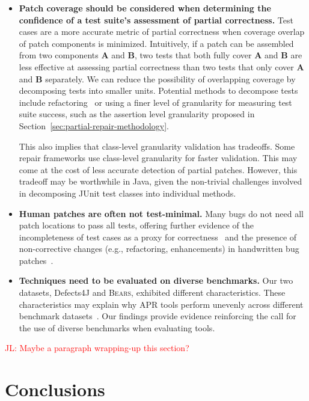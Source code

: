 \documentclass[10pt, conference]{IEEEtran}
\newcommand\todo[1]{\textcolor{red}{#1}}
\newcommand\bears{\textsc{Bears}\xspace}
\begin{document}
\begin{itemize}[wide, labelindent=0pt]
\item\textbf{Patch coverage should be considered when determining the
  confidence of a test suite's assessment of partial correctness.}
Test cases are a more accurate metric of partial correctness when coverage
overlap of patch components is minimized. Intuitively, if a patch can be
assembled from two components \textbf{A} and \textbf{B}, two tests that both
fully cover \textbf{A} and \textbf{B} are less effective at assessing partial
correctness than two tests that only cover \textbf{A} and \textbf{B} separately.
We can reduce the possibility of overlapping coverage by decomposing tests into
smaller units. Potential methods to decompose tests include
refactoring~\cite{b-refactoring} or using a finer level of granularity for
measuring test suite success, such as the assertion level granularity proposed
in Section~\ref{sec:partial-repair-methodology}.

This also implies that class-level granularity validation has tradeoffs. Some
repair frameworks use class-level granularity for faster validation. This may
come at the cost of less accurate detection of partial patches. However, this
tradeoff may be worthwhile in Java, given the non-trivial challenges involved in
decomposing JUnit test classes into individual methods.

\item\textbf{Human patches are often not test-minimal.}
Many bugs do not need all patch locations to pass all tests,
offering further evidence of the incompleteness of test cases as a
proxy for correctness~\cite{patch-correctness} and the
presence of non-corrective changes (e.g., refactoring, enhancements)
in handwritten bug patches~\cite{api-refactoring, tangledchanges}.

\item\textbf{Techniques need to be evaluated on diverse benchmarks.}
Our two datasets, Defects4J and \bears, exhibited different characteristics.
These characteristics may explain why APR tools perform unevenly across
different benchmark datasets~\cite{durieux-repair-them-all}. Our findings
provide evidence reinforcing the call for the use of diverse benchmarks when
evaluating tools.
\end{itemize}

\todo{JL: Maybe a paragraph wrapping-up this section?}

\section{Conclusions}
\label{sec:conclusions}
\end{document}
